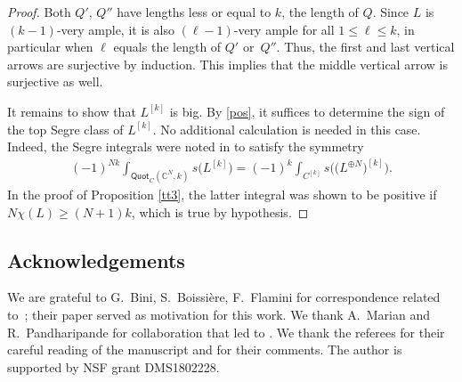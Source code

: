 \documentclass[10pt,a4paper]{amsart}
\numberwithin{equation}{section}
\begin{document}
\begin{proof}
Both $Q'$, $Q''$ have lengths less or equal to $k$, the length of $Q$. Since $L$ is $(k-1)$-very ample, it is also $(\ell-1)$-very ample for all $1\leq \ell\leq k$, in particular when $\ell$ equals the length of $Q'$ or~$Q''$. Thus, the first and last vertical arrows are surjective by induction. This implies that the middle vertical arrow is surjective as well.

It remains to show that $L^{[k]}$ is big. By \eqref{pos}, it suffices to determine the sign of the top Segre class of $L^{[k]}$. No additional calculation is needed in this case. Indeed, the Segre integrals were noted in \cite[Corollary~10]{OP2021} to satisfy the symmetry
\begin{gather*}
(-1)^{Nk} \int_{{\mathsf{Quot}}_C(\mathbb C^N, k)} s\big(L^{[k]}\big)=(-1)^k\int_{C^{[k]}} s\bigl(\big(L^{\oplus N}\big)^{[k]}\bigr).
\end{gather*}
In the proof of Proposition \ref{tt3}, the latter integral was shown to be positive if $N\chi (L)\geq (N+1)k$, which is true by hypothesis.
\end{proof}

\subsection*{Acknowledgements}

We are grateful to G.~Bini, S.~Boissi\`ere, F.~Flamini for correspondence related to~\cite{BBF}; their paper served as motivation for this work. We thank A.~Marian and R.~Pandharipande for collaboration that led to \cite{MOP2, MOP1, MOP, OP2021}. We thank the referees for their careful reading of the manuscript and for their comments. The author is supported by NSF grant DMS1802228.

\end{document}

